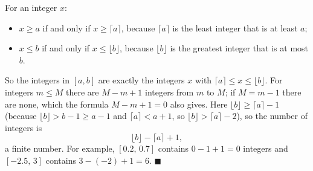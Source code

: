 For an integer $x$:
\begin{itemize}
\item $x\ge a$ if and only if $x\ge\lceil a\rceil$, because $\lceil a\rceil$ is the least integer that is at least $a$;
\item $x\le b$ if and only if $x\le\lfloor b\rfloor$, because $\lfloor b\rfloor$ is the greatest integer that is at most $b$.
\end{itemize}
So the integers in $[a,b]$ are exactly the integers $x$ with $\lceil a\rceil\le x\le\lfloor b\rfloor$. For integers $m\le M$ there are $M-m+1$ integers from $m$ to $M$; if $M=m-1$ there are none, which the formula $M-m+1=0$ also gives. Here $\lfloor b\rfloor\ge\lceil a\rceil-1$ (because $\lfloor b\rfloor>b-1\ge a-1$ and $\lceil a\rceil<a+1$, so $\lfloor b\rfloor>\lceil a\rceil-2$), so the number of integers is
\[\lfloor b\rfloor-\lceil a\rceil+1,\]
a finite number. For example, $[0.2,\,0.7]$ contains $0-1+1=0$ integers and $[-2.5,\,3]$ contains $3-(-2)+1=6$. $\blacksquare$
